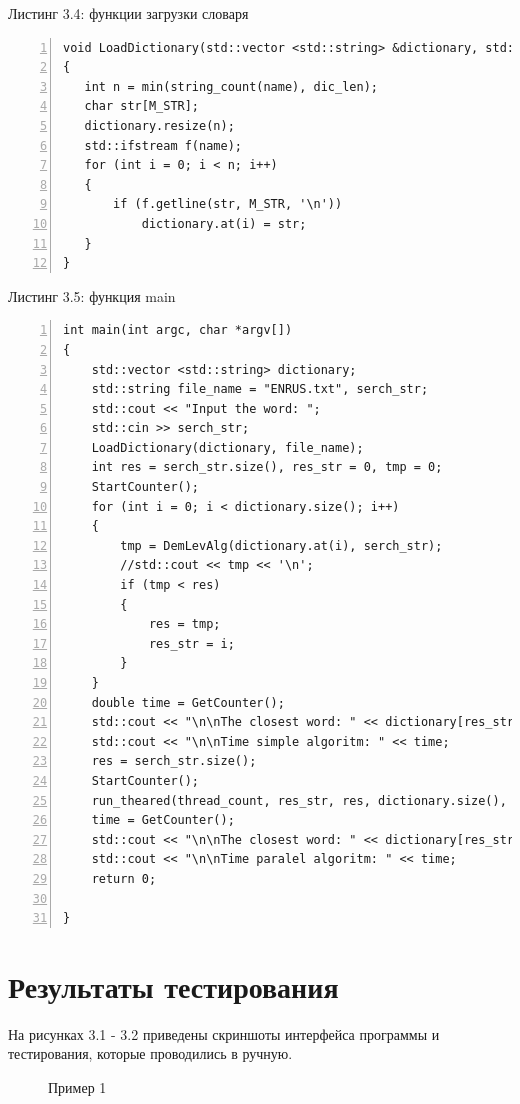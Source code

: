 \documentclass[12pt,a4paper]{report}
\begin{document}
\newpage
\textrm{Листинг 3.4: функции загрузки словаря}
\begin{lstlisting}[frame=single, numbers=left]
void LoadDictionary(std::vector <std::string> &dictionary, std::string &name)
{
   int n = min(string_count(name), dic_len);
   char str[M_STR];
   dictionary.resize(n);
   std::ifstream f(name);
   for (int i = 0; i < n; i++)
   {
       if (f.getline(str, M_STR, '\n'))
           dictionary.at(i) = str;
   }
}
\end{lstlisting}
\newpage
\textrm{Листинг 3.5: функция main}
\begin{lstlisting}[frame=single, numbers=left]
int main(int argc, char *argv[])
{
    std::vector <std::string> dictionary;
    std::string file_name = "ENRUS.txt", serch_str;
    std::cout << "Input the word: ";
    std::cin >> serch_str;
    LoadDictionary(dictionary, file_name);
    int res = serch_str.size(), res_str = 0, tmp = 0;
    StartCounter();
    for (int i = 0; i < dictionary.size(); i++)
    {
        tmp = DemLevAlg(dictionary.at(i), serch_str);
        //std::cout << tmp << '\n';
        if (tmp < res)
        {
            res = tmp;
            res_str = i;
        }
    }
    double time = GetCounter();
    std::cout << "\n\nThe closest word: " << dictionary[res_str];
    std::cout << "\n\nTime simple algoritm: " << time;
    res = serch_str.size();
    StartCounter();
    run_theared(thread_count, res_str, res, dictionary.size(), dictionary, serch_str);
    time = GetCounter();
    std::cout << "\n\nThe closest word: " << dictionary[res_str];
    std::cout << "\n\nTime paralel algoritm: " << time;
    return 0;

}
\end{lstlisting}
\section{Результаты тестирования}

На рисунках 3.1 - 3.2 приведены скриншоты интерфейса программы и тестирования, которые проводились в ручную.

\begin{figure}[h!]
    \caption{Пример 1}
    \label{fig:image}
\end{figure}
\end{document}
